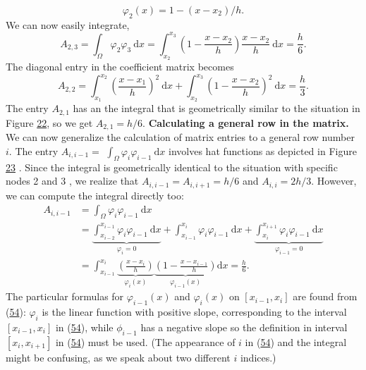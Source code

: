 \documentclass[../main.tex]{subfiles}
\begin{document}
$$
\varphi_{2}(x)=1-\left(x-x_{2}\right) / h .
$$
We can now easily integrate,
$$
A_{2,3}=\int_{\Omega} \varphi_{2} \varphi_{3} \mathrm{~d} x=\int_{x_{2}}^{x_{3}}\left(1-\frac{x-x_{2}}{h}\right) \frac{x-x_{2}}{h} \mathrm{~d} x=\frac{h}{6}.
$$
The diagonal entry in the coefficient matrix becomes
$$
A_{2,2}=\int_{x_{1}}^{x_{2}}\left(\frac{x-x_{1}}{h}\right)^{2} \mathrm{~d} x+\int_{x_{2}}^{x_{3}}\left(1-\frac{x-x_{2}}{h}\right)^{2} \mathrm{~d} x=\frac{h}{3}.
$$
The entry $A_{2,1}$ has an the integral that is geometrically similar to the situation in Figure \hyperref[fig:img_22]{22}, so we get $A_{2,1}=h / 6$.
\bigbreak
\noindent \textbf{Calculating a general row in the matrix.} We can now generalize the calculation of matrix entries to a general row number $i$. The entry $A_{i, i-1}=$ $\int_{\Omega} \varphi_{i} \varphi_{i-1} \mathrm{~d} x$ involves hat functions as depicted in Figure \hyperref[fig:img_23]{23} . Since the integral is geometrically identical to the situation with specific nodes 2 and 3 , we realize that $A_{i, i-1}=A_{i, i+1}=h / 6$ and $A_{i, i}=2 h / 3$. However, we can compute the integral directly too:
$$
\begin{aligned}
	A_{i, i-1} &=\int_{\Omega} \varphi_{i} \varphi_{i-1} \mathrm{~d} x \\
	&=\underbrace{\int_{x_{i-2}}^{x_{i-1}} \varphi_{i} \varphi_{i-1} \mathrm{~d} x}_{\varphi_{i}=0}+\int_{x_{i-1}}^{x_{i}} \varphi_{i} \varphi_{i-1} \mathrm{~d} x+\underbrace{\int_{x_{i}}^{x_{i+1}} \varphi_{i} \varphi_{i-1} \mathrm{~d} x}_{\varphi_{i-1}=0} \\
	&=\int_{x_{i-1}}^{x_{i}} \underbrace{\left(\frac{x-x_{i}}{h}\right)}_{\varphi_{i}(x)} \underbrace{\left(1-\frac{x-x_{i-1}}{h}\right)}_{\varphi_{i-1}(x)} \mathrm{d} x=\frac{h}{6}.
\end{aligned}
$$
The particular formulas for $\varphi_{i-1}(x)$ and $\varphi_{i}(x)$ on $\left[x_{i-1}, x_{i}\right]$ are found from (\hyperref[eqa54]{54}): $\varphi_{i}$ is the linear function with positive slope, corresponding to the interval $\left[x_{i-1}, x_{i}\right]$ in (\hyperref[eqa54]{54}), while $\phi_{i-1}$ has a negative slope so the definition in interval $\left[x_{i}, x_{i+1}\right]$ in (\hyperref[eqa54]{54}) must be used. (The appearance of $i$ in (\hyperref[eqa54]{54}) and the integral might be confusing, as we speak about two different $i$ indices.)
\end{document}
